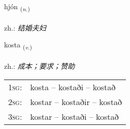 \documentclass[frontgrid, backgrid]{flacards}\usepackage[]{graphicx}\usepackage[]{xcolor}
\begin{document}
\renewcommand{\flhead}{\vskip5pt \fboxsep=0pt {\small\bfseries\footnotesize Nafnorð | 名词}}
\renewcommand{\fcfoot}{\vskip5pt \fboxsep=0pt \hspace{2pt}{\small\bfseries\footnotesize 1K}}

\renewcommand{\blhead}{\vskip5pt {\small\bfseries\footnotesize Nafnorð | 名词 }}
\renewcommand{\bcfoot}{\vskip5pt \hspace{2pt}{\small\bfseries\footnotesize 1K}}


{hjón \small{\textsubscript{(\textit{n.})}} \\[1ex] %
\textphonetic{[çouːn]} \\
zh.: \emph{结婚夫妇} \\  [2ex]
\renewcommand*{\arraystretch}{0.8}
}

\renewcommand{\flhead}{\vskip5pt \fboxsep=0pt {\small\bfseries\footnotesize Sagnorð | 动词}}
\renewcommand{\fcfoot}{\vskip5pt \fboxsep=0pt \hspace{2pt}{\small\bfseries\footnotesize 1K}}

\renewcommand{\blhead}{\vskip5pt {\small\bfseries\footnotesize Sagnorð | 动词 }}
\renewcommand{\bcfoot}{\vskip5pt \hspace{2pt}{\small\bfseries\footnotesize 1K}}


{kosta \small{\textsubscript{(\textit{v.})}} \\[1ex] %
\textphonetic{[kʰɔsta]} \\
zh.: \emph{成本；要求；赞助} \\  [2ex]
\renewcommand*{\arraystretch}{0.8}
\begin{tabular}{p{1cm}l}
\textsc{1sg}: & kosta -- kostaði -- kostað \\ 
\textsc{2sg}: & kostar -- kostaðir -- kostað \\ 
\textsc{3sg}: & kostar -- kostaði -- kostað \\ 
\end{tabular}
}
\end{document}
